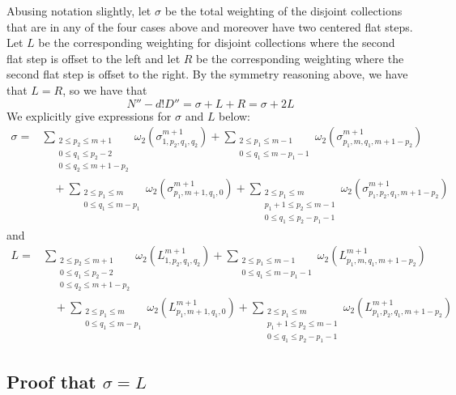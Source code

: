 \documentclass[11pt]{article}
\theoremstyle{mythm}
\begin{document}
Abusing notation slightly, let $\sigma$ be the total weighting of the disjoint collections that are in any of the four cases above and moreover have two centered flat steps. Let $L$ be the corresponding weighting for disjoint collections where the second flat step is offset to the left and let $R$ be the corresponding weighting where the second flat step is offset to the right. By the symmetry reasoning above, we have that $L=R$, so we have that
\begin{equation*}
N'' - d!D'' = \sigma + L + R = \sigma + 2L
\end{equation*}
We explicitly give expressions for $\sigma$ and $L$ below:
\begin{align*}
\sigma = &\sum\limits_{\substack{2\leq p_2\leq m+1 \\ 0\leq q_1 \leq p_2-2 \\ 0 \leq q_2 \leq m+1-p_2}}\omega_2(\sigma_{1,p_2,q_1,q_2}^{m+1}) + \sum\limits_{\substack{2 \leq p_1 \leq m-1 \\ 0 \leq q_1 \leq m-p_1-1}}\omega_2(\sigma_{p_1,m,q_1,m+1-p_2}^{m+1}) \\
 &\quad+ \sum\limits_{\substack{2 \leq p_1 \leq m \\ 0 \leq q_1 \leq m-p_1}}\omega_2(\sigma_{p_1,m+1,q_1,0}^{m+1}) + \sum\limits_{\substack{2 \leq p_1 \leq m \\ p_1+1 \leq p_2 \leq m-1 \\ 0 \leq q_1 \leq p_2-p_1-1}} \omega_2(\sigma_{p_1,p_2,q_1,m+1-p_2}^{m+1})
\end{align*}
and
\begin{align*}
L = &\sum\limits_{\substack{2\leq p_2\leq m+1 \\ 0\leq q_1 \leq p_2-2 \\ 0 \leq q_2 \leq m+1-p_2}}\omega_2(L_{1,p_2,q_1,q_2}^{m+1}) + \sum\limits_{\substack{2 \leq p_1 \leq m-1 \\ 0 \leq q_1 \leq m-p_1-1}}\omega_2(L_{p_1,m,q_1,m+1-p_2}^{m+1}) \\
 &\quad+ \sum\limits_{\substack{2 \leq p_1 \leq m \\ 0 \leq q_1 \leq m-p_1}}\omega_2(L_{p_1,m+1,q_1,0}^{m+1}) + \sum\limits_{\substack{2 \leq p_1 \leq m \\ p_1+1 \leq p_2 \leq m-1 \\ 0 \leq q_1 \leq p_2-p_1-1}} \omega_2(L_{p_1,p_2,q_1,m+1-p_2}^{m+1})
\end{align*}

\subsection{Proof that $\sigma = L$}
\end{document}
